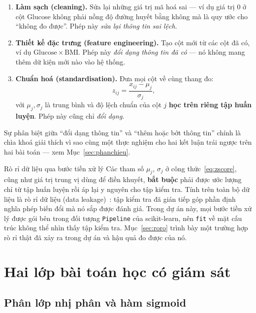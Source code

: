 \begin{enumerate}
  \item \textbf{Làm sạch (cleaning).} Sửa lại những giá trị mã hoá sai --- ví
        dụ giá trị $0$ ở cột Glucose không phải nồng độ đường huyết bằng không
        mà là quy ước cho ``không đo được''. Phép này \emph{sửa lại thông tin
        sai lệch}.
  \item \textbf{Thiết kế đặc trưng (feature engineering).} Tạo cột mới từ các
        cột đã có, ví dụ $\mathrm{Glucose}\times\mathrm{BMI}$. Phép này
        \emph{đổi dạng thông tin đã có} --- nó không mang thêm dữ kiện mới nào
        vào hệ thống.
  \item \textbf{Chuẩn hoá (standardisation).} Đưa mọi cột về cùng thang đo:
        \begin{equation}
          z_{ij} = \frac{x_{ij}-\mu_j}{\sigma_j},
          \label{eq:zscore}
        \end{equation}
        với $\mu_j,\sigma_j$ là trung bình và độ lệch chuẩn của cột $j$
        \textbf{học trên riêng tập huấn luyện}. Phép này cũng chỉ
        \emph{đổi dạng}.
\end{enumerate}

Sự phân biệt giữa ``đổi dạng thông tin'' và ``thêm hoặc bớt thông tin'' chính
là chìa khoá giải thích vì sao cùng một thực nghiệm cho hai kết luận trái ngược
trên hai bài toán --- xem Mục~\ref{sec:phanchieu}.

\begin{phathien}{Rò rỉ dữ liệu qua bước tiền xử lý}
Các tham số $\mu_j$, $\sigma_j$ ở công thức~\eqref{eq:zscore}, cũng như giá trị
trung vị dùng để điền khuyết, \textbf{bắt buộc} phải được ước lượng chỉ từ tập
huấn luyện rồi áp lại y nguyên cho tập kiểm tra. Tính trên toàn bộ dữ liệu là
rò rỉ dữ liệu (data leakage)~\cite{kaufman2012}: tập kiểm tra đã gián tiếp góp phần định nghĩa
phép biến đổi mà nó sắp được đánh giá. Trong dự án này, mọi bước tiền xử lý
được gói bên trong đối tượng \texttt{Pipeline} của scikit-learn, nên
\texttt{fit} về mặt cấu trúc không thể nhìn thấy tập kiểm tra.
Mục~\ref{sec:roro} trình bày một trường hợp rò rỉ thật đã xảy ra trong dự án và
hậu quả đo được của nó.
\end{phathien}

\section{Hai lớp bài toán học có giám sát}

\subsection{Phân lớp nhị phân và hàm sigmoid}

